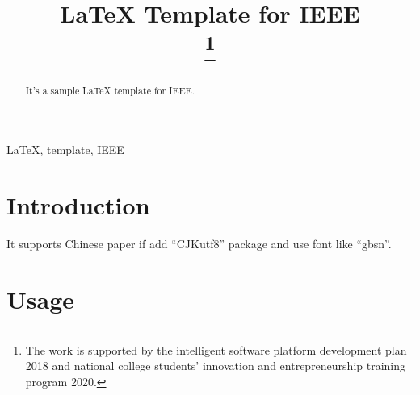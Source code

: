 \documentclass[conference]{IEEEtran}
\begin{document}

\title{LaTeX Template for IEEE\\
\thanks{The work is supported by the intelligent software platform development plan 2018 and national college students' innovation and entrepreneurship training program 2020.}
}

\author{

\and
{}

}

\maketitle

\begin{abstract}
  It's a sample LaTeX template for IEEE. 
\end{abstract}

\begin{IEEEkeywords}
LaTeX, template, IEEE
\end{IEEEkeywords}

\section{Introduction}
It supports Chinese paper if add ``CJKutf8'' package and use font like ``gbsn''.

\section{Usage}
\end{document}
